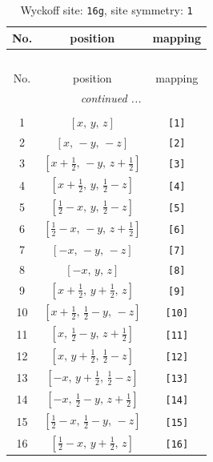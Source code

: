 \documentclass[fleqn,8pt]{jsarticle}
\begin{document}
\begin{longtable}{ccc}
\caption{Wyckoff site: {\tt 16g}, site symmetry: {\tt 1}}
 \\
 \hline \hline
No. & position & mapping \\ \hline \endfirsthead

\multicolumn{2}{l}{\tablename\ \thetable{}} \\
 \hline \hline
No. & position & mapping \\ \hline \endhead

 \hline \hline
\multicolumn{2}{r}{\footnotesize\it continued ...} \\ \endfoot

 \hline \hline
\multicolumn{2}{r}{} \\ \endlastfoot

1 & $\left[ x,\, y,\, z \right]$ & {\tt [1]} \\ \hline
2 & $\left[ x,\, - y,\, - z \right]$ & {\tt [2]} \\ \hline
3 & $\left[ x + \frac{1}{2},\, - y,\, z + \frac{1}{2} \right]$ & {\tt [3]} \\ \hline
4 & $\left[ x + \frac{1}{2},\, y,\, \frac{1}{2} - z \right]$ & {\tt [4]} \\ \hline
5 & $\left[ \frac{1}{2} - x,\, y,\, \frac{1}{2} - z \right]$ & {\tt [5]} \\ \hline
6 & $\left[ \frac{1}{2} - x,\, - y,\, z + \frac{1}{2} \right]$ & {\tt [6]} \\ \hline
7 & $\left[ - x,\, - y,\, - z \right]$ & {\tt [7]} \\ \hline
8 & $\left[ - x,\, y,\, z \right]$ & {\tt [8]} \\ \hline
9 & $\left[ x + \frac{1}{2},\, y + \frac{1}{2},\, z \right]$ & {\tt [9]} \\ \hline
10 & $\left[ x + \frac{1}{2},\, \frac{1}{2} - y,\, - z \right]$ & {\tt [10]} \\ \hline
11 & $\left[ x,\, \frac{1}{2} - y,\, z + \frac{1}{2} \right]$ & {\tt [11]} \\ \hline
12 & $\left[ x,\, y + \frac{1}{2},\, \frac{1}{2} - z \right]$ & {\tt [12]} \\ \hline
13 & $\left[ - x,\, y + \frac{1}{2},\, \frac{1}{2} - z \right]$ & {\tt [13]} \\ \hline
14 & $\left[ - x,\, \frac{1}{2} - y,\, z + \frac{1}{2} \right]$ & {\tt [14]} \\ \hline
15 & $\left[ \frac{1}{2} - x,\, \frac{1}{2} - y,\, - z \right]$ & {\tt [15]} \\ \hline
16 & $\left[ \frac{1}{2} - x,\, y + \frac{1}{2},\, z \right]$ & {\tt [16]} \\
\end{longtable}
\end{document}

